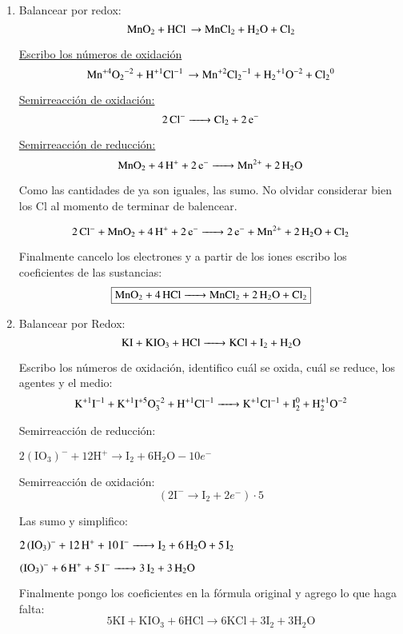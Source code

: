\begin{enumerate}
\item Balancear por redox:
$$\ce{MnO_2 + HCl \rightarrow MnCl_2 + H_2O + Cl_2}$$

\underline{Escribo los números de oxidación}
$$\ce{Mn^{+4}O_2^{-2} + H^{+1}Cl^{-1} \rightarrow Mn^{+2}Cl_2^{-1} + H_2^{+1}O^{-2} + Cl_2^{0}}$$

\begin{multicols}{2}
    \underline{Semirreacción de oxidación:}
    $$\ce{2Cl^- ->
    Cl_2 + 2e^-}$$
    
    \underline{Semirreacción de reducción:}
    $$\ce{MnO_2 + 4 H^+ + 2e^- ->
    Mn^{2+} + 2H_2O}$$
\end{multicols}

Como las cantidades de  ya son iguales, las sumo. No olvidar considerar bien los Cl al momento de terminar de balencear.

$$\ce{2 Cl^- + MnO_2 + 4H^+ + 2e^- -> 2e^- + Mn^{2+} + 2H_2O + Cl_2}$$

Finalmente cancelo los electrones y a partir de los iones escribo los coeficientes de las sustancias:
$$\fbox{\ce{MnO_2 + 4HCl -> MnCl_2 + 2H_2O + Cl_2}}$$


\item Balancear por Redox:
$$\ce{
KI + KIO3 + HCl ->
KCl + I2 + H2O
}$$

Escribo los números de oxidación, identifico cuál se oxida, cuál se reduce, los agentes y el medio: 
$$\ce{
K^{+1}I^{-1} + K^{+1}I^{+5}O^{-2}3 + H^{+1}Cl^{-1} ->
K^{+1}Cl^{-1} + I^{0}2 + H^{+1}2O^{-2}
}$$


\begin{multicols}{2}
Semirreacción de reducción:

\hfil$2(\text{IO}_3)^{-} + 12 \text{H}^+ \longrightarrow \text{I}_2 + 6\text{H}_2 \text{O} - 10e^-$\hfil

Semirreacción de oxidación:
$$\left(2\text{I}^{-} \longrightarrow \text{I}_2 + 2e^-\right)\cdot 5$$
\end{multicols}

Las sumo y simplifico:

\hfil$\ce{2(IO3)^- + 12H^+ + 10 I^- -> I2 + 6H2O + 5I2}$\hfil

\hfil$\ce{(IO3)^- + 6H^+ + 5 I^- -> 3I2 + 3H2O }$\hfil

Finalmente pongo los coeficientes en la fórmula original y agrego lo que haga falta:
\[\boxed{5\text{KI} + \text{K} \text{I} \text{O}_3 + 6\text{H} \text{Cl} \longrightarrow
6\text{KCl} + 3\text{I}_2 +  3\text{H}_2 \text{O}}\]



\end{enumerate}
